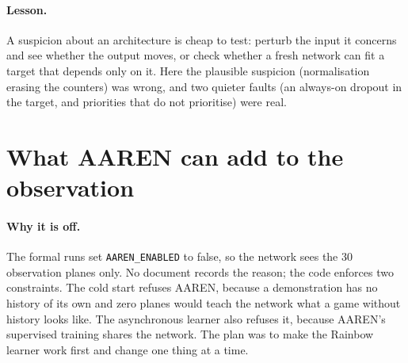 \paragraph{Lesson.} A suspicion about an architecture is cheap to test: perturb the input it
concerns and see whether the output moves, or check whether a fresh network can fit a target
that depends only on it. Here the plausible suspicion (normalisation erasing the counters) was
wrong, and two quieter faults (an always-on dropout in the target, and priorities that do not
prioritise) were real.

\section{What AAREN can add to the observation}

\paragraph{Why it is off.} The formal runs set \texttt{AAREN\_ENABLED} to false, so the network sees
the 30 observation planes only. No document records the reason; the code enforces two
constraints. The cold start refuses AAREN, because a demonstration has no history of its own and
zero planes would teach the network what a game without history looks like. The asynchronous
learner also refuses it, because AAREN's supervised training shares the network. The plan was to
make the Rainbow learner work first and change one thing at a time.

